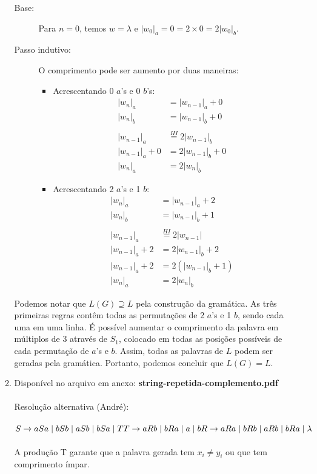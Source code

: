 \documentclass[brazil, a4paper,12pt]{article}
\begin{document}
\begin{enumerate}
\begin{enumerate}
\begin{description}
      \item[Base:] Para $n = 0$, temos $w = \lambda$ e $|w_0|_a = 0 = 2 \times 0 =
    2|w_0|_b$.

      \item[Passo indutivo:] O comprimento pode ser aumento por duas maneiras:
      \begin{itemize}
        \item Acrescentando 0 $a$'s e 0 $b$'s:
          \begin{align*}
            |w_n|_a &= |w_{n-1}|_a + 0 \\
            |w_n|_b &= |w_{n-1}|_b + 0 \\
            \\
            |w_{n-1}|_a &\overset{HI}{=} 2|w_{n-1}|_b \\
            |w_{n-1}|_a + 0 &= 2|w_{n-1}|_b + 0 \\
            |w_n|_a &= 2|w_n|_b
          \end{align*}

        \item Acrescentando 2 $a$'s e 1 $b$:
          \begin{align*}
            |w_n|_a &= |w_{n-1}|_a + 2 \\
            |w_n|_b &= |w_{n-1}|_b + 1 \\
            \\
            |w_{n-1}|_a &\overset{HI}{=} 2|w_{n-1}|\\
            |w_{n-1}|_a + 2 &= 2|w_{n-1}|_b + 2\\
            |w_{n-1}|_a + 2 &= 2(|w_{n-1}|_b + 1)\\
            |w_n|_a &= 2|w_n|_b
          \end{align*}
      \end{itemize}

    \end{description}

    Podemos notar que $L(G) \supseteq L$ pela construção da gramática. As três
    primeiras regras contêm todas as permutações de 2 $a$'s e 1 $b$, sendo cada
    uma em uma linha. É possível aumentar o comprimento da palavra em múltiplos
    de 3 através de $S_1$, colocado em todas as posições possíveis de cada
    permutação de $a$'s e $b$. Assim, todas as palavras de $L$ podem ser geradas
    pela gramática. Portanto, podemos concluir que $L(G) = L$.


  \item Disponível no arquivo em anexo: \textbf{string-repetida-complemento.pdf}
  \\ \\
  Resolução alternativa (André):\\
  \\
  $ S \rightarrow aSa \mid bSb \mid aSb \mid bSa \mid T \\
    T \rightarrow aRb \mid bRa \mid a \mid b \\
    R \rightarrow aRa \mid bRb \mid aRb \mid bRa \mid \lambda $ \\ \\
  A produção T garante que a palavra gerada tem $x_i \neq y_i$ ou que tem comprimento ímpar.



\end{enumerate}
\end{enumerate}
\end{document}
